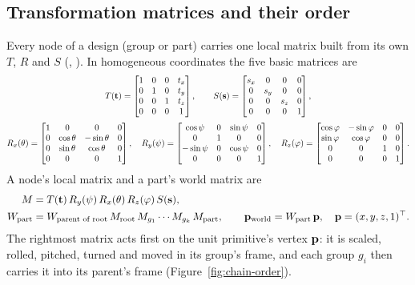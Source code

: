 \subsection{Transformation matrices and their order}
\label{sec:decomp-mats}
Every node of a design (group or part) carries one local matrix built from its own $T$, $R$ and $S$
(, ). In homogeneous coordinates the five basic matrices are
\begin{gather}
T(\mathbf{t})=\begin{bmatrix}1&0&0&t_x\\0&1&0&t_y\\0&0&1&t_z\\0&0&0&1\end{bmatrix},\qquad
S(\mathbf{s})=\begin{bmatrix}s_x&0&0&0\\0&s_y&0&0\\0&0&s_z&0\\0&0&0&1\end{bmatrix},\label{eq:basicTS}\\[1mm]
R_x(\theta)=\begin{bmatrix}1&0&0&0\\0&\cos\theta&-\sin\theta&0\\0&\sin\theta&\cos\theta&0\\0&0&0&1\end{bmatrix},\quad
R_y(\psi)=\begin{bmatrix}\cos\psi&0&\sin\psi&0\\0&1&0&0\\-\sin\psi&0&\cos\psi&0\\0&0&0&1\end{bmatrix},\quad
R_z(\varphi)=\begin{bmatrix}\cos\varphi&-\sin\varphi&0&0\\\sin\varphi&\cos\varphi&0&0\\0&0&1&0\\0&0&0&1\end{bmatrix}.\label{eq:basicmats}
\end{gather}
A node's local matrix and a part's world matrix are
\begin{align}
M&=T(\mathbf{t})\,R_y(\psi)\,R_x(\theta)\,R_z(\varphi)\,S(\mathbf{s}),\label{eq:localM}\\
W_{\text{part}}&=W_{\text{parent of root}}\,M_{\text{root}}\,M_{g_1}\cdots M_{g_k}\,M_{\text{part}},\qquad
\mathbf{p}_{\text{world}}=W_{\text{part}}\,\mathbf{p},\quad \mathbf{p}=(x,y,z,1)^\top.\label{eq:chainW}
\end{align}
The rightmost matrix acts first on the unit primitive's vertex $\mathbf{p}$: it is scaled, rolled, pitched, turned and moved
in its group's frame, and each group $g_i$ then carries it into its parent's frame (Figure~\ref{fig:chain-order}).

